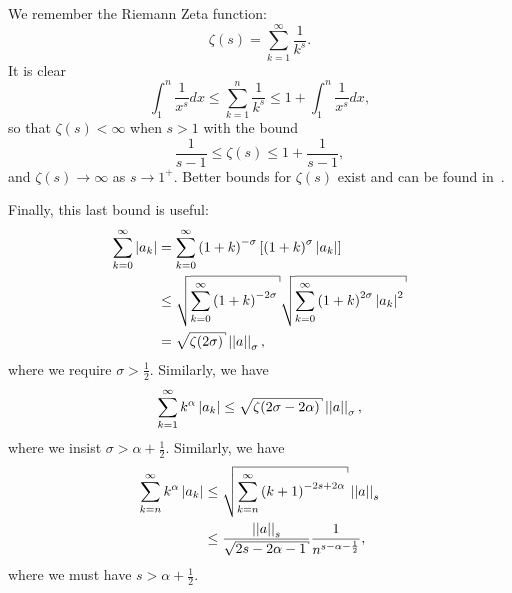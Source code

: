 We remember the Riemann Zeta function:
%
\begin{equation}
    \zeta(s) = \sum_{k=1}^{\infty} \frac{1}{k^{s}}.
\end{equation}
%
It is clear
%
\begin{equation}
    \int_{1}^{n} \frac{1}{x^{s}}dx \le \sum_{k=1}^{n} \frac{1}{k^{s}}
        \le 1 + \int_{1}^{n}\frac{1}{x^{s}}dx,
\end{equation}
%
so that $\zeta(s) < \infty$ when $s>1$ with
the bound
%
\begin{equation}
    \frac{1}{s-1} \le \zeta(s) \le 1 + \frac{1}{s-1},
\end{equation}
%
and $\zeta(s)\to\infty$ as $s\to1^{+}$.
Better bounds for $\zeta(s)$ exist and can be found in~\cite{RZApprox}.

Finally, this last bound is useful:
%
\begin{align}
    \sum_{k=0}^{\infty}\abs{a_{k}}
        &= \sum_{k=0}^{\infty} \parens{1+k}^{-\sigma}
            \brackets{\parens{1+k}^{\sigma}\abs{a_{k}}} \nonumber\\
        &\le \sqrt{\sum_{k=0}^{\infty} \parens{1+k}^{-2\sigma}}
             \sqrt{\sum_{k=0}^{\infty} \parens{1+k}^{2\sigma}\abs{a_{k}}^{2}}
                \nonumber\\
        &= \sqrt{\zeta(2\sigma)} \norm{a}_{\sigma},
    \label{eq:CS_coefs}
\end{align}
%
where we require $\sigma>\frac{1}{2}$.
Similarly, we have
%
\begin{equation}
    \sum_{k=1}^{\infty} k^{\alpha}\abs{a_{k}} \le
        \sqrt{\zeta(2\sigma-2\alpha)}\norm{a}_{\sigma},
    \label{eq:CS_coefs_powers}
\end{equation}
%
where we insist $\sigma>\alpha+\frac{1}{2}$.
Similarly, we have
%
\begin{align}
    \sum_{k=n}^{\infty} k^{\alpha}\abs{a_{k}}
        &\le \sqrt{\sum_{k=n}^{\infty}\parens{k+1}^{-2s+2\alpha}}\norm{a}_{s}
            \nonumber\\
    &\le \frac{\norm{a}_{s}}{\sqrt{2s-2\alpha-1}}
        \frac{1}{n^{s-\alpha-\frac{1}{2}}},
    \label{eq:cvip_approx_coefs_tail_bound}
\end{align}
%
where we must have $s>\alpha + \frac{1}{2}$.
